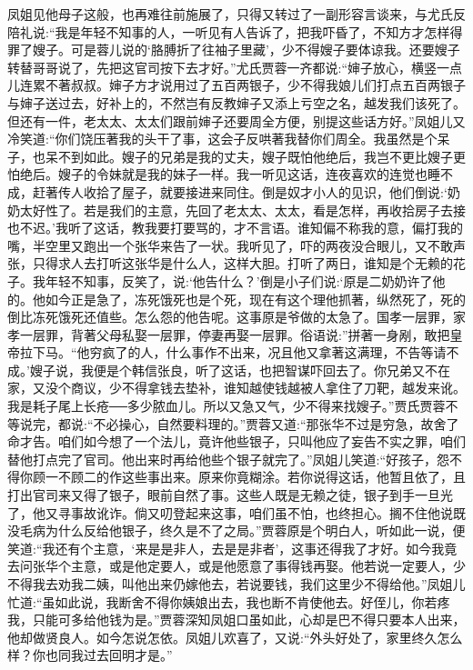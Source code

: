 \begin{parag}
    凤姐见他母子这般，也再难往前施展了，只得又转过了一副形容言谈来，与尤氏反陪礼说:“我是年轻不知事的人，一听见有人告诉了，把我吓昏了，不知方才怎样得罪了嫂子。可是蓉儿说的‘胳膊折了往袖子里藏’，少不得嫂子要体谅我。还要嫂子转替哥哥说了，先把这官司按下去才好。”尤氏贾蓉一齐都说:“婶子放心，横竖一点儿连累不著叔叔。婶子方才说用过了五百两银子，少不得我娘儿们打点五百两银子与婶子送过去，好补上的，不然岂有反教婶子又添上亏空之名，越发我们该死了。但还有一件，老太太、太太们跟前婶子还要周全方便，别提这些话方好。”凤姐儿又冷笑道:“你们饶压著我的头干了事，这会子反哄著我替你们周全。我虽然是个呆子，也呆不到如此。嫂子的兄弟是我的丈夫，嫂子既怕他绝后，我岂不更比嫂子更怕绝后。嫂子的令妹就是我的妹子一样。我一听见这话，连夜喜欢的连觉也睡不成，赶著传人收拾了屋子，就要接进来同住。倒是奴才小人的见识，他们倒说:‘奶奶太好性了。若是我们的主意，先回了老太太、太太，看是怎样，再收拾房子去接也不迟。’我听了这话，教我要打要骂的，才不言语。谁知偏不称我的意，偏打我的嘴，半空里又跑出一个张华来告了一状。我听见了，吓的两夜没合眼儿，又不敢声张，只得求人去打听这张华是什么人，这样大胆。打听了两日，谁知是个无赖的花子。我年轻不知事，反笑了，说:‘他告什么？’倒是小子们说:‘原是二奶奶许了他的。他如今正是急了，冻死饿死也是个死，现在有这个理他抓著，纵然死了，死的倒比冻死饿死还值些。怎么怨的他告呢。这事原是爷做的太急了。国孝一层罪，家孝一层罪，背著父母私娶一层罪，停妻再娶一层罪。俗语说:”拼著一身剐，敢把皇帝拉下马。“他穷疯了的人，什么事作不出来，况且他又拿著这满理，不告等请不成。’嫂子说，我便是个韩信张良，听了这话，也把智谋吓回去了。你兄弟又不在家，又没个商议，少不得拿钱去垫补，谁知越使钱越被人拿住了刀靶，越发来讹。我是耗子尾上长疮──多少脓血儿。所以又急又气，少不得来找嫂子。”贾氏贾蓉不等说完，都说:“不必操心，自然要料理的。”贾蓉又道:“那张华不过是穷急，故舍了命才告。咱们如今想了一个法儿，竟许他些银子，只叫他应了妄告不实之罪，咱们替他打点完了官司。他出来时再给他些个银子就完了。”凤姐儿笑道:“好孩子，怨不得你顾一不顾二的作这些事出来。原来你竟糊涂。若你说得这话，他暂且依了，且打出官司来又得了银子，眼前自然了事。这些人既是无赖之徒，银子到手一旦光了，他又寻事故讹诈。倘又叨登起来这事，咱们虽不怕，也终担心。搁不住他说既没毛病为什么反给他银子，终久是不了之局。”贾蓉原是个明白人，听如此一说，便笑道:“我还有个主意，‘来是是非人，去是是非者’，这事还得我了才好。如今我竟去问张华个主意，或是他定要人，或是他愿意了事得钱再娶。他若说一定要人，少不得我去劝我二姨，叫他出来仍嫁他去，若说要钱，我们这里少不得给他。”凤姐儿忙道:“虽如此说，我断舍不得你姨娘出去，我也断不肯使他去。好侄儿，你若疼我，只能可多给他钱为是。”贾蓉深知凤姐口虽如此，心却是巴不得只要本人出来，他却做贤良人。如今怎说怎依。凤姐儿欢喜了，又说:“外头好处了，家里终久怎么样？你也同我过去回明才是。” 
\end{parag}
